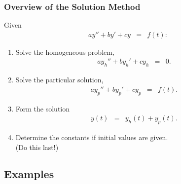 \begin{frame}
  \frametitle{Overview of the Solution Method}

  Given
  \begin{eqnarray*}
    a y'' + by' + cy & = & f(t):
  \end{eqnarray*}
  \begin{enumerate}
  \item Solve the homogeneous problem,
    \begin{eqnarray*}
      a y_h'' + by_h' + cy_h & = & 0.
    \end{eqnarray*}
  \item Solve the particular solution,
    \begin{eqnarray*}
      a y_p'' + by_p' + cy_p & = & f(t).
    \end{eqnarray*}
  \item Form the solution
    \begin{eqnarray*}
      y(t) & = & y_h(t) + y_p(t).
    \end{eqnarray*}
  \item Determine the constants if initial values are given. \\
    (Do this last!)
  \end{enumerate}


\end{frame}

\subsection{Examples}


